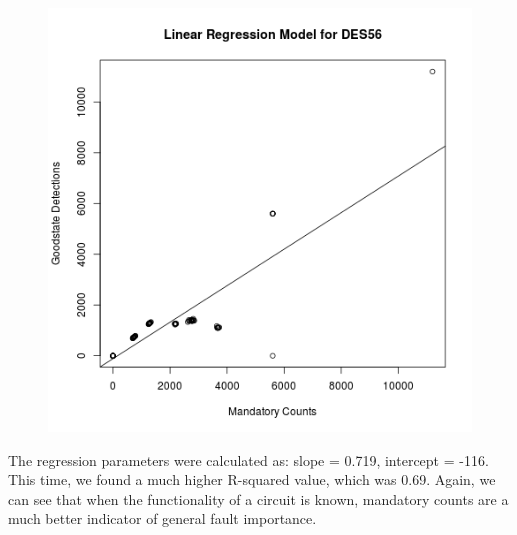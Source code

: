     \begin{figure}[h!]
    \centering
    \caption{\label{fig:deslinereg}}
    \includegraphics[scale=0.5]{Figures/deslinereg.png}
    \end{figure} 

    The regression parameters were calculated as: slope = 0.719, intercept = -116. 
    This time, we found a much higher R-squared value, which was 0.69.
    Again, we can see that when the functionality of a circuit is known, mandatory counts are a much better indicator of general fault importance. 
